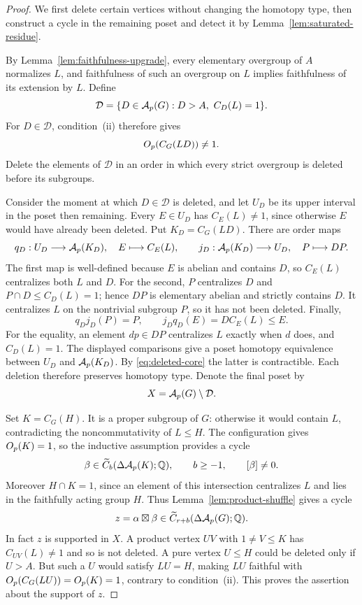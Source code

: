 \begin{proof}
We first delete certain vertices without changing the homotopy type,
then construct a cycle in the remaining poset and detect it by
Lemma~\ref{lem:saturated-residue}.

By Lemma~\ref{lem:faithfulness-upgrade}, every elementary overgroup
of $A$ normalizes $L$, and faithfulness of such an overgroup on $L$
implies faithfulness of its extension by $L$.  Define
\[
 \mathcal D=\{D\in\Ap(G):D>A,\ C_D(L)=1\}.
\]
For $D\in\mathcal D$, condition~\textup{(ii)} therefore gives
\begin{equation}\label{eq:deleted-core}
 O_p(C_G(LD))\ne1.
\end{equation}
Delete the elements of $\mathcal D$ in an order in which every strict
overgroup is deleted before its subgroups.

Consider the moment at which $D\in\mathcal D$ is deleted, and
let $U_D$ be its upper interval in the poset then remaining.
Every $E\in U_D$ has $C_E(L)\ne1$, since otherwise $E$ would have
already been deleted.  Put $K_D=C_G(LD)$.  There are order maps
\[
 q_D:U_D\longrightarrow\mathcal A_p(K_D),\quad E\longmapsto C_E(L),
 \qquad
 j_D:\mathcal A_p(K_D)\longrightarrow U_D,\quad P\longmapsto DP.
\]
The first map is well-defined because $E$ is abelian and contains
$D$, so $C_E(L)$ centralizes both $L$ and $D$.  For the second,
$P$ centralizes $D$ and
$P\cap D\le C_D(L)=1$; hence $DP$ is elementary abelian and
strictly contains $D$.  It centralizes $L$ on the nontrivial subgroup
$P$, so it has not been deleted.  Finally,
\[
 q_Dj_D(P)=P,\qquad j_Dq_D(E)=D C_E(L)\le E.
\]
For the equality, an element $dp\in DP$ centralizes $L$ exactly
when $d$ does, and $C_D(L)=1$.  The displayed comparisons give a
poset homotopy equivalence between $U_D$ and $\mathcal A_p(K_D)$.
By \eqref{eq:deleted-core} the latter is contractible.  Each deletion
therefore preserves homotopy type.  Denote the final poset by
\[
 X=\mathcal A_p(G)\setminus\mathcal D.
\]

Set $K=C_G(H)$.  It is a proper subgroup of $G$: otherwise it would
contain $L$, contradicting the noncommutativity of $L\le H$.
The configuration gives $O_p(K)=1$, so the inductive assumption
provides a cycle
\[
 \beta\in\widetilde C_b(\Delta\mathcal A_p(K);\mathbb Q),\qquad b\ge-1,
 \qquad [\beta]\ne0.
\]
Moreover $H\cap K=1$, since an element of this intersection
centralizes $L$ and lies in the faithfully acting group $H$.
Thus Lemma~\ref{lem:product-shuffle} gives a cycle
\[
 z=\alpha\boxtimes\beta
     \in\widetilde C_{r+b}(\Delta\mathcal A_p(G);\mathbb Q).
\]
In fact $z$ is supported in $X$.  A product vertex $UV$ with
$1\ne V\le K$ has $C_{UV}(L)\ne1$ and so is not deleted.
A pure vertex $U\le H$ could be deleted only if $U>A$.
But such a $U$ would satisfy $LU=H$, making $LU$ faithful with
$O_p(C_G(LU))=O_p(K)=1$, contrary to condition~\textup{(ii)}.
This proves the assertion about the support of $z$.


\end{proof}
